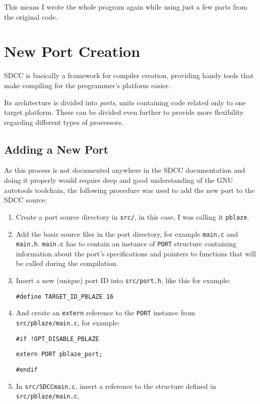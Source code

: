     This means I wrote the whole program again while using just a few parts from the original code.


\chapter{New Port Creation}\label{port}

SDCC is basically a framework for compiler creation, providing handy tools that make compiling for the programmer's platform easier.

Its architecture is divided into \emph{ports}, units containing code related only to one target platform. These can be divided even further to provide more flexibility regarding different types of processors.

    \section{Adding a New Port}

    As this process is not documented anywhere in the SDCC documentation and doing it properly would require deep and good understanding of the GNU autotools toolchain, the following procedure was used to add the new port to the SDCC source:

    \begin{enumerate}

    \item Create a port source directory in \texttt{src/}, in this case, I was calling it \texttt{pblaze}.

    \item Add the basic source files in the port directory, for example \texttt{main.c} and \texttt{main.h}. \texttt{main.c} has to contain an instance of \texttt{PORT} structure containing information about the port's specifications and pointers to functions that will be called during the compilation.

    \item Insert a new (unique) port ID into \texttt{src/port.h}, like this for example:

    \texttt{\#define TARGET\_ID\_PBLAZE    16}

    \item And create an \texttt{extern} reference to the \texttt{PORT} instance from \texttt{src/pblaze/main.c}, for example:

    \texttt{\#if !OPT\_DISABLE\_PBLAZE}

    \texttt{extern PORT pblaze\_port;}

    \texttt{\#endif}

    \item In \texttt{src/SDCCmain.c}, insert a reference to the structure defined in \texttt{src/pblaze/main.c}.

    \end{enumerate}

